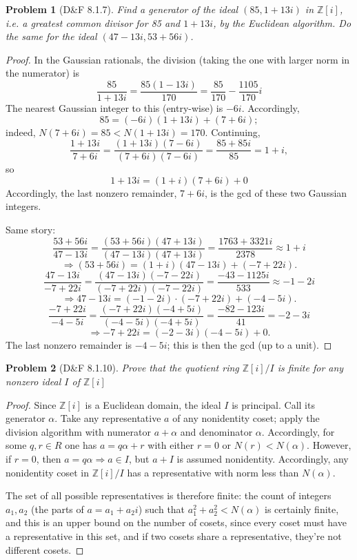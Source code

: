 \documentclass{article}
\newtheorem{plm}{Problem}
\begin{document}
\begin{plm}[D\&F 8.1.7]
  Find a generator of the ideal $(85, 1 + 13i)$ in $\mathbb{Z}[i]$, i.e. a greatest common divisor for 85 and $1 + 13i$, by the Euclidean algorithm.
  Do the same for the ideal $(47 - 13i, 53 + 56i)$.
\end{plm}

\begin{proof}
  In the Gaussian rationals, the division (taking the one with larger norm in the numerator) is
  \[
    \frac{85}{1 + 13i} = \frac{85(1 - 13i)}{170} = \frac{85}{170} - \frac{1105}{170}i
  \]
  The nearest Gaussian integer to this (entry-wise) is $-6i$.
  Accordingly,
  \[
    85 = (-6i)(1 + 13i) + (7 + 6i);
  \]
  indeed, $N(7 + 6i) = 85 < N(1 + 13i) = 170$.
  Continuing,
  \[
    \frac{1 + 13i}{7 + 6i} = \frac{(1 + 13i)(7 - 6i)}{(7 + 6i)(7 - 6i)} = \frac{85 + 85i}{85} = 1 + i,
  \]
  so
  \[
    1 + 13i = (1 + i)(7 + 6i) + 0
  \]
  Accordingly, the last nonzero remainder, $7 + 6i$, is the gcd of these two Gaussian integers.

  Same story:
  \[
    \frac{53 + 56i}{47 - 13i} = \frac{(53 + 56i)(47 + 13i)}{(47 - 13i)(47 + 13i)} = \frac{1763 + 3321i}{2378} \approx 1 + i
  \]
  \[
    \Rightarrow (53 + 56i) = (1 + i)(47 - 13i) + (-7 + 22i).
  \]
  \[
    \frac{47 - 13i}{-7 + 22i} = \frac{(47 - 13i)(-7 - 22i)}{(-7 + 22i)(-7 - 22i)} = \frac{-43 - 1125i}{533} \approx -1 - 2i
  \]
  \[
    \Rightarrow 47 - 13i = (-1 - 2i) \cdot (-7 + 22i) + (-4 - 5i).
  \]
  \[
    \frac{-7 + 22i}{-4 - 5i} = \frac{(-7 + 22i)(-4 + 5i)}{(-4 - 5i)(-4 + 5i)} = \frac{-82 - 123i}{41} = -2 - 3i
  \]
  \[
    \Rightarrow -7 + 22i = (-2 -3i)(-4 - 5i) + 0.
  \]
  The last nonzero remainder is $-4 - 5i$; this is then the gcd (up to a unit).
\end{proof}

\begin{plm}[D\&F 8.1.10]
  Prove that the quotient ring $\mathbb{Z}[i] / I$ is finite for any nonzero ideal $I$ of $\mathbb{Z}[i]$
\end{plm}

\begin{proof}
  Since $\mathbb{Z}[i]$ is a Euclidean domain, the ideal $I$ is principal.
  Call its generator $\alpha$.
  Take any representative $a$ of any nonidentity coset; apply the division algorithm with numerator $a + \alpha$ and denominator $\alpha$.
  Accordingly, for some $q,r \in R$ one has $a = q\alpha + r$ with either $r = 0$ or $N(r) < N(\alpha)$.
  However, if $r = 0$, then $a = q\alpha \Rightarrow a \in I$, but $a + I$ is assumed nonidentity.
  Accordingly, any nonidentity coset in $\mathbb{Z}[i] / I$ has a representative with norm less than $N(\alpha)$.

  The set of all possible representatives is therefore finite: the count of integers $a_{1}, a_{2}$ (the parts of $a = a_{1} + a_{2}i$)
  such that $a_{1}^{2} + a_{2}^{2} < N(\alpha)$ is certainly finite, and this is an upper bound on the number of cosets,
  since every coset must have a representative in this set, and if two cosets share a representative, they're not different cosets.
\end{proof}
\end{document}
